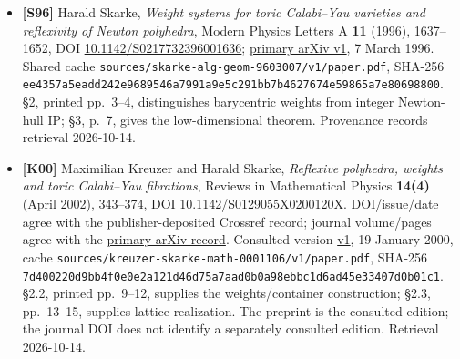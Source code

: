 \documentclass[11pt,a4paper,oneside]{report}
\begin{document}
\begin{itemize}
  SHA-256
  \texttt{c6f0e514\allowbreak{}c078f861\allowbreak{}86dcb4f6\allowbreak{}6b97f237\allowbreak{}904fcb8d\allowbreak{}689261db\allowbreak{}3825408f\allowbreak{}7977a284};
  original gzip tar \texttt{source.\allowbreak{}download}, SHA-256
  \texttt{b50f6f0b\allowbreak{}cfcf7936\allowbreak{}7e9eabe0\allowbreak{}4a7e337c\allowbreak{}717ad4e6\allowbreak{}ec107239\allowbreak{}8aa0d337\allowbreak{}d9c3f3f2};
  extraction
  \texttt{tex/\allowbreak{}fakeWeig\allowbreak{}htedProj\allowbreak{}ectiveSp\allowbreak{}aces.\allowbreak{}tex}
  and \texttt{.\allowbreak{}bbl}. Retrieved 2026-10-14; perpetual
  non-exclusive arXiv distribution license, no broader grant inferred.
  PDF text extraction had glyph-encoding problems; author TeX supplied
  the actual readable arguments.
\item
  \textbf{{[}S96{]}} Harald Skarke, \emph{Weight systems for toric
  Calabi--Yau varieties and reflexivity of Newton polyhedra}, Modern
  Physics Letters A \textbf{11} (1996), 1637--1652, DOI
  \href{https://doi.org/10.1142/S0217732396001636}{10.\allowbreak{}1142/\allowbreak{}S0217732\allowbreak{}39600163\allowbreak{}6};
  \href{https://arxiv.org/abs/alg-geom/9603007v1}{primary arXiv v1}, 7
  March 1996. Shared cache
  \texttt{sources/\allowbreak{}skarke-\allowbreak{}alg-\allowbreak{}geom-\allowbreak{}9603007/\allowbreak{}v1/\allowbreak{}paper.\allowbreak{}pdf},
  SHA-256
  \texttt{ee4357a5\allowbreak{}eadd242e\allowbreak{}9689546a\allowbreak{}7991a9e5\allowbreak{}c291bb7b\allowbreak{}4627674e\allowbreak{}59865a7e\allowbreak{}80698800}.
  §2, printed pp.~3--4, distinguishes barycentric weights from integer
  Newton-hull IP; §3, p.~7, gives the low-dimensional theorem.
  Provenance records retrieval 2026-10-14.
\item
  \textbf{{[}K00{]}} Maximilian Kreuzer and Harald Skarke,
  \emph{Reflexive polyhedra, weights and toric Calabi--Yau fibrations},
  Reviews in Mathematical Physics \textbf{14(4)} (April 2002), 343--374,
  DOI
  \href{https://doi.org/10.1142/S0129055X0200120X}{10.\allowbreak{}1142/\allowbreak{}S0129055\allowbreak{}X0200120\allowbreak{}X}.
  DOI/issue/date agree with the publisher-deposited Crossref record;
  journal volume/pages agree with the
  \href{https://arxiv.org/abs/math/0001106}{primary arXiv record}.
  Consulted version \href{https://arxiv.org/pdf/math/0001106v1}{v1}, 19
  January 2000, cache
  \texttt{sources/\allowbreak{}kreuzer-\allowbreak{}skarke-\allowbreak{}math-\allowbreak{}0001106/\allowbreak{}v1/\allowbreak{}paper.\allowbreak{}pdf},
  SHA-256
  \texttt{7d400220\allowbreak{}d9bb4f0e\allowbreak{}0e2a121d\allowbreak{}46d75a7a\allowbreak{}ad0b0a98\allowbreak{}ebbc1d6a\allowbreak{}d45e3340\allowbreak{}7d0b01c1}.
  §2.2, printed pp.~9--12, supplies the weights/container construction;
  §2.3, pp.~13--15, supplies lattice realization. The preprint is the
  consulted edition; the journal DOI does not identify a separately
  consulted edition. Retrieval 2026-10-14.
\end{itemize}
\end{document}
